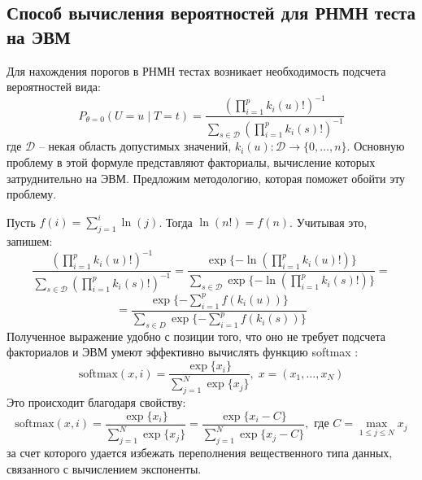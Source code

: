 \subsection{Способ вычисления вероятностей для РНМН теста
на ЭВМ}

Для нахождения порогов в РНМН тестах возникает необходимость
подсчета вероятностей вида:
$$P_{\theta=0}(U=u \mid T=t)=\dfrac{(\prod_{i=1}^p k_i(u)!)^{-1}}
            {\sum_{s\in \mathcal{D}} (\prod_{i=1}^p k_i(s)!)^{-1}}$$
где $\mathcal{D}$ -- некая область допустимых значений,
$k_i(u):\mathcal{D} \to \{0,\ldots,n\}$.
Основную проблему в этой формуле представляют 
факториалы, вычисление которых затруднительно на ЭВМ. 
Предложим методологию, которая поможет обойти эту проблему.

    Пусть $f(i)=\sum_{j=1}^{i} \ln(j)$. Тогда $\ln(n!)=f(n)$.
    Учитывая это, запишем:
    $$
    \dfrac{(\prod_{i=1}^p k_i(u)!)^{-1}}
            {\sum_{s\in \mathcal{D}} (\prod_{i=1}^p k_i(s)!)^{-1}}=
    \dfrac{\exp\{-\ln(\prod_{i=1}^p k_i(u)!)\}}
    {\sum_{s\in \mathcal{D}} \exp \{-\ln(\prod_{i=1}^p k_i(s)!)\}}=
    $$
    $$
    = \dfrac{\exp \{ -\sum_{i=1}^p f(k_i(u)) \}}
    {\sum_{s \in D} \exp \{ -\sum_{i=1}^p f(k_i(s)) \}}
    $$
Полученное выражение удобно с позиции того, что оно не требует подсчета факториалов и ЭВМ умеют 
эффективно вычислять функцию softmax \cite{softmax}:
$$
\text{softmax}(x,i)=\dfrac{\exp\{x_i\}}{\sum_{j=1}^{N} \exp\{x_j\}}, \; x=(x_1,\ldots,x_N)
$$
Это происходит благодаря свойству:
$$
\text{softmax}(x,i)=\dfrac{\exp\{x_i\}}{\sum_{j=1}^{N} \exp\{x_j\}} = \dfrac{\exp\{x_i - C\}}{\sum_{j=1}^{N} \exp\{x_j - C\}}
, \text{ где } C=\max_{1\leq j \leq N} x_j
$$
за счет которого удается избежать переполнения вещественного типа данных, 
связанного с вычислением экспоненты.
